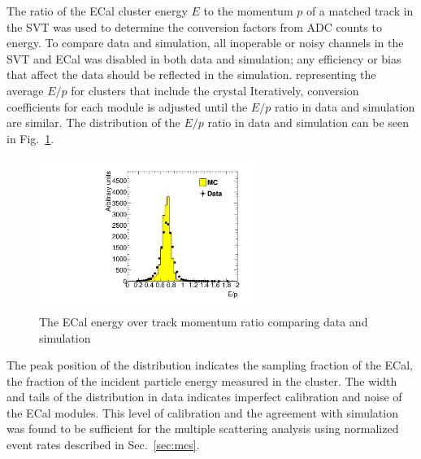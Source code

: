 \documentclass[final,3p,times,twocolumn]{elsarticle}
\begin{document}
The ratio of the ECal cluster energy $E$ to the momentum $p$ of a matched track in the SVT was used 
to determine the conversion factors from ADC counts to energy. To compare data and simulation, all 
inoperable or noisy channels in the SVT and ECal was disabled in both data and simulation; any 
efficiency or bias that affect the data should be reflected in the simulation. 
representing the average $E/p$ for clusters that include the crystal
Iteratively, conversion coefficients for each module is adjusted until the $E/p$ ratio in data and 
simulation are similar. The distribution of the $E/p$ ratio in data and simulation can be seen in 
Fig.~\ref{fig:gains}. 
{\small
\begin{figure}[]
\begin{center}
	\includegraphics[width=7cm]{figures/h_ep_data_0_h_ep_MC_0_dataMC_1351-v6-v6gains_2-trig-top-cl600reg0.pdf}
	\caption{The ECal energy over track momentum ratio comparing data and simulation} 
	\label{fig:gains}
\end{center}
\end{figure}
}
The peak position of the distribution indicates the sampling fraction of the ECal, 
the fraction of the incident particle energy measured in the cluster. The width and tails of the distribution 
in data indicates imperfect calibration and noise of the ECal modules. This level of calibration and the 
agreement with simulation was found to be sufficient for the multiple scattering analysis using 
normalized event rates described in Sec.~\ref{sec:mcs}.

\end{document}
